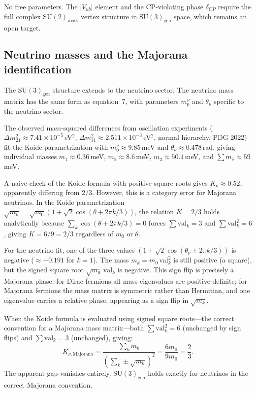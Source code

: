 \documentclass[11pt]{article}
\begin{document}
No free parameters. The $|V_{ub}|$ element and the CP-violating phase $\delta_{CP}$ require the full complex $\mathrm{SU}(2)_{\mathrm{weak}}$ vertex structure in $\mathrm{SU}(3)_{\mathrm{gen}}$ space, which remains an open target.

\subsection{Neutrino masses and the Majorana identification}
\label{sec:neutrinos}

The $\mathrm{SU}(3)_{\mathrm{gen}}$ structure extends to the neutrino sector. The neutrino mass matrix has the same form as equation~7, with parameters $m_0^\nu$ and $\theta_\nu$ specific to the neutrino sector.

The observed mass-squared differences from oscillation experiments ($\Delta m_{21}^2\approx 7.41\times 10^{-5}$\,eV$^2$, $\Delta m_{31}^2\approx 2.511\times 10^{-3}$\,eV$^2$, normal hierarchy, PDG 2022) fit the Koide parametrization with $m_0^\nu\approx 9.85$\,meV and $\theta_\nu\approx 0.478$\,rad, giving individual masses $m_1\approx 0.36$\,meV, $m_2\approx 8.6$\,meV, $m_3\approx 50.1$\,meV, and $\sum m_\nu\approx 59$\,meV.

A naive check of the Koide formula with positive square roots gives $K_\nu\approx 0.52$, apparently differing from $2/3$. However, this is a category error for Majorana neutrinos. In the Koide parametrization $\sqrt{m_k}=\sqrt{m_0}(1+\sqrt{2}\cos(\theta+2\pi k/3))$, the relation $K=2/3$ holds analytically because $\sum_k\cos(\theta+2\pi k/3)=0$ forces $\sum\mathrm{val}_k=3$ and $\sum\mathrm{val}_k^2=6$, giving $K=6/9=2/3$ regardless of $m_0$ or $\theta$.

For the neutrino fit, one of the three values $(1+\sqrt{2}\cos(\theta_\nu+2\pi k/3))$ is negative ($\approx -0.191$ for $k=1$). The mass $m_k=m_0\,\mathrm{val}_k^2$ is still positive (a square), but the signed square root $\sqrt{m_0}\,\mathrm{val}_k$ is negative. This sign flip is precisely a Majorana phase: for Dirac fermions all mass eigenvalues are positive-definite; for Majorana fermions the mass matrix is symmetric rather than Hermitian, and one eigenvalue carries a relative phase, appearing as a sign flip in $\sqrt{m_k}$.

When the Koide formula is evaluated using signed square roots---the correct convention for a Majorana mass matrix---both $\sum\mathrm{val}_k^2=6$ (unchanged by sign flips) and $\sum\mathrm{val}_k=3$ (unchanged), giving:
\begin{equation}
K_{\nu,\mathrm{Majorana}} = \frac{\sum_k m_k}{\left(\sum_k \pm\sqrt{m_k}\right)^2} = \frac{6m_0}{9m_0} = \frac{2}{3}.
\end{equation}
The apparent gap vanishes entirely. $\mathrm{SU}(3)_{\mathrm{gen}}$ holds exactly for neutrinos in the correct Majorana convention.
\end{document}
